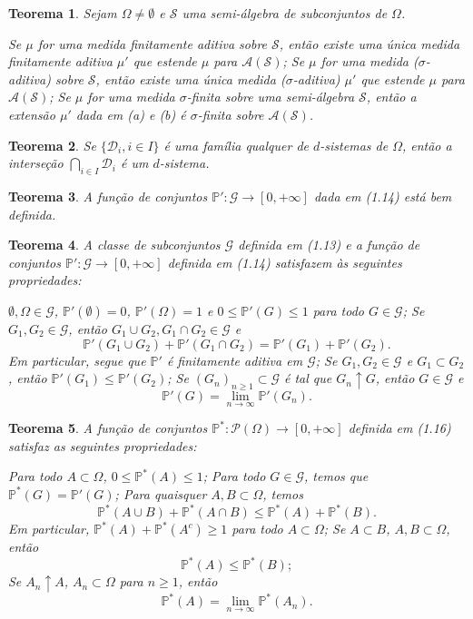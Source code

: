\documentclass[12pt,a4paper,answers]{article}
\numberwithin{equation}{section} %
\renewcommand{\P}{\mathbb{P}}
\newcommand{\Acal}{\mathcal{A}}
\newcommand{\Dcal}{\mathcal{D}}
\newcommand{\Gcal}{\mathcal{G}}
\newcommand{\Pcal}{\mathcal{P}}
\newcommand{\Scal}{\mathcal{S}}
\theoremstyle{thm_estilo}
\newtheorem{theorem}{Teorema}[section]
\theoremstyle{thm_note_est}
\begin{document}
\begin{theorem}
	Sejam $\Omega \neq \emptyset$ e $\Scal$ uma semi-álgebra de subconjuntos de $\Omega$.
	\begin{outline}[enumerate]
		\1 Se $\mu$ for uma medida finitamente aditiva sobre $\Scal$, então existe uma única medida finitamente aditiva $\mu'$ que estende $\mu$ para $\Acal(\Scal)$;
		\1 Se $\mu$ for uma medida ($\sigma$-aditiva) sobre $\Scal$, então existe uma única medida ($\sigma$-aditiva) $\mu'$ que estende $\mu$ para $\Acal(\Scal)$;
		\1 Se $\mu$ for uma medida $\sigma$-finita sobre uma semi-álgebra $\Scal$, então a extensão $\mu'$ dada em (a) e (b) é $\sigma$-finita sobre $\Acal(\Scal)$.
	\end{outline}
\end{theorem}

\begin{theorem}
	Se $\{\Dcal_i, i \in I\}$ é uma família qualquer de $d$-sistemas de $\Omega$, então a interseção $\bigcap_{i \in I} \Dcal_i$ é um $d$-sistema.
\end{theorem}

\begin{theorem}
	A função de conjuntos $\P' : \Gcal \to [0, +\infty]$ dada em (1.14) está bem definida.
\end{theorem}

\begin{theorem}
	A classe de subconjuntos $\Gcal$ definida em (1.13) e a função de conjuntos $\P' : \Gcal \to [0, +\infty]$ definida em (1.14) satisfazem às seguintes propriedades:
	\begin{outline}[enumerate]
		\1 $\emptyset, \Omega \in \Gcal$, $\P'(\emptyset) = 0$, $\P'(\Omega) = 1$ e $0 \leq \P'(G) \leq 1$ para todo $G \in \Gcal$;
		\1 Se $G_1, G_2 \in \Gcal$, então $G_1 \cup G_2, G_1 \cap G_2 \in \Gcal$ e
		\[
		\P'(G_1 \cup G_2) + \P'(G_1 \cap G_2) = \P'(G_1) + \P'(G_2).
		\]
		Em particular, segue que $\P'$ é finitamente aditiva em $\Gcal$;
		\1 Se $G_1, G_2 \in \Gcal$ e $G_1 \subset G_2$, então $\P'(G_1) \leq \P'(G_2)$;
		\1 Se $(G_n)_{n\geq 1} \subset \Gcal$ é tal que $G_n \uparrow G$, então $G \in \Gcal$ e
		\[
		\P'(G) = \lim_{n \to \infty} \P'(G_n).
		\]
	\end{outline}
\end{theorem}

\begin{theorem}
	A função de conjuntos $\P^* : \Pcal(\Omega) \to [0, +\infty]$ definida em (1.16) satisfaz as seguintes propriedades:
	\begin{outline}[enumerate]
		\1 Para todo $A \subset \Omega$, $0 \leq \P^*(A) \leq 1$;
		\1 Para todo $G \in \Gcal$, temos que $\P^*(G) = \P'(G)$;
		\1 Para quaisquer $A, B \subset \Omega$, temos
		\[
		\P^*(A \cup B) + \P^*(A \cap B) \leq \P^*(A) + \P^*(B).
		\]
		Em particular, $\P^*(A) + \P^*(A^c) \geq 1$ para todo $A \subset \Omega$;
		\1 Se $A \subset B$, $A, B \subset \Omega$, então
		\[
		\P^*(A) \leq \P^*(B);
		\]
		\1 Se $A_n \uparrow A$, $A_n \subset \Omega$ para $n \geq 1$, então
		\[
		\P^*(A) = \lim_{n \to \infty} \P^*(A_n).
		\]
	\end{outline}
\end{theorem}
\end{document}
